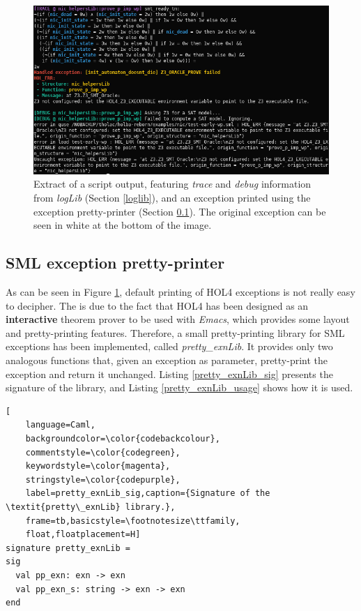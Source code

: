 \documentclass{kththesis}
\begin{document}
{\begin{figure}[t]
	\includegraphics[width=\textwidth]{figures/loglib-ppexn-ppterm.png}
	\centering
	\caption{Extract of a script output, featuring \textit{trace} and \textit{debug} information from \textit{logLib} (Section \ref{loglib}), and an exception printed using the exception pretty-printer (Section \ref{pp_exn}). The original exception can be seen in white at the bottom of the image.}
	\label{loglib-ppexn-ppterm}
\end{figure}

\subsection{SML exception pretty-printer} \label{pp_exn}

As can be seen in Figure \ref{loglib-ppexn-ppterm}, default printing of HOL4 exceptions is not really easy to decipher. The is due to the fact that HOL4 has been designed as an \textbf{interactive} theorem prover to be used with \textit{Emacs}, which provides some layout and pretty-printing features. Therefore, a small pretty-printing library for SML exceptions has been implemented, called \textit{pretty\_exnLib}. It provides only two analogous functions that, given an exception as parameter, pretty-print the exception and return it unchanged. Listing \ref{pretty_exnLib_sig} presents the signature of the library, and Listing \ref{pretty_exnLib_usage} shows how it is used.

\begin{lstlisting}[
    language=Caml,
    backgroundcolor=\color{codebackcolour},
    commentstyle=\color{codegreen},
    keywordstyle=\color{magenta},
    stringstyle=\color{codepurple},
    label=pretty_exnLib_sig,caption={Signature of the \textit{pretty\_exnLib} library.},
    frame=tb,basicstyle=\footnotesize\ttfamily,
    float,floatplacement=H]
signature pretty_exnLib =
sig
  val pp_exn: exn -> exn
  val pp_exn_s: string -> exn -> exn
end
\end{lstlisting}


}
\end{document}

